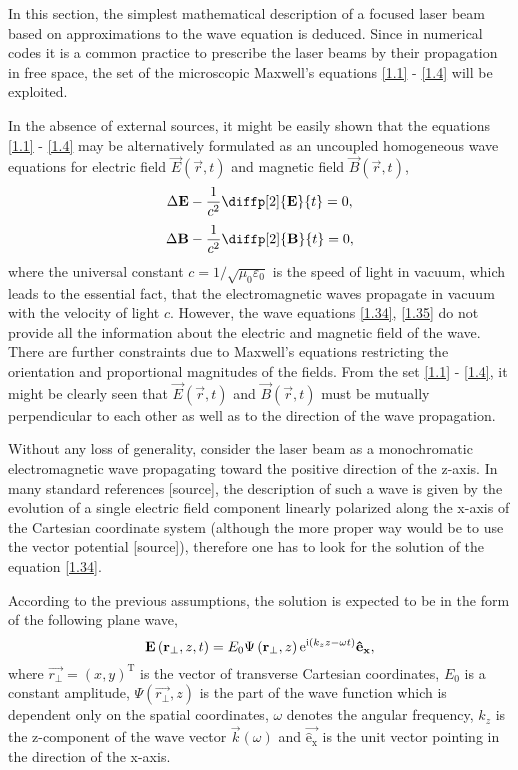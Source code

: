 In this section, the simplest mathematical description of a focused laser beam based on approximations to the wave equation is deduced. Since in numerical codes it is a common practice to prescribe the laser beams by their propagation in free space, the set of the microscopic Maxwell's equations \ref{1.1} - \ref{1.4} will be exploited.

In the absence of external sources, it might be easily shown that the equations \ref{1.1} - \ref{1.4} may be alternatively formulated as an uncoupled homogeneous wave equations for electric field $ \vec{E}\left( \vec{r}, t \right) $ and magnetic field $ \vec{B}\left( \vec{r}, t \right) $,
\begin{equation}
\label{1.34}
\laplace{\vec{E}} - \frac{1}{c^{2}} \diffp[2]{\vec{E}}{t} = 0,
\end{equation}
\begin{equation}
\label{1.35}
\laplace{\vec{B}} - \frac{1}{c^{2}} \diffp[2]{\vec{B}}{t} = 0,
\end{equation}
where the universal constant $ c = 1/\sqrt{\mu_0 \varepsilon_0} $ is the speed of light in vacuum, which leads to the essential fact, that the electromagnetic waves propagate in vacuum with the velocity of light $ c $. However, the wave equations \ref{1.34}, \ref{1.35} do not provide all the information about the electric and magnetic field of the wave. There are further constraints due to Maxwell's equations restricting the orientation and proportional magnitudes of the fields. From the set \ref{1.1} - \ref{1.4}, it might be clearly seen that $ \vec{E}\left( \vec{r}, t \right) $ and $ \vec{B}\left( \vec{r}, t \right) $ must be mutually perpendicular to each other as well as to the direction of the wave propagation. 

Without any loss of generality, consider the laser beam as a monochromatic electromagnetic wave propagating toward the positive direction of the z-axis. In many standard references [source], the description of such a wave is given by the evolution of a single electric field component linearly polarized along the x-axis of the Cartesian coordinate system (although the more proper way would be to use the vector potential [source]), therefore one has to look for the solution of the equation \ref{1.34}. 

According to the previous assumptions, the solution is expected to be in the form of the following plane wave,
\begin{equation}
\label{1.36}
\mathbf{E}\left(\mathbf{r_\bot}, z, t \right)  = E_0 \Psi \left(\mathbf{r_\bot}, z \right) \mathrm{e}^{\mathrm{i} \left(k_z z - \omega t \right)} \mathrm{\mathbf{\hat{e}_x}},
\end{equation}
where $ \vec{r_\bot} = (x, y)^{\mathrm{T}} $ is the vector of transverse Cartesian coordinates, $ E_0 $ is a constant amplitude, $ \Psi \left(\vec{r_\bot}, z \right) $ is the part of the wave function which is dependent only on the spatial coordinates, $ \omega $ denotes the angular frequency, $ k_z $ is the z-component of the wave vector $ \vec{k}\left(\omega \right) $ and $ \mathrm{\vec{\hat{e}_x}} $ is the unit vector pointing in the direction of the x-axis.

